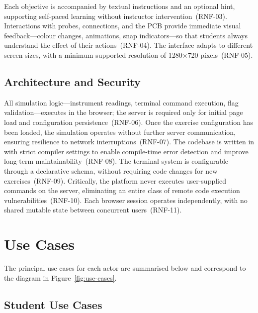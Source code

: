 Each objective is accompanied by textual instructions and an optional hint, supporting self-paced learning without instructor intervention~(RNF-03). Interactions with probes, connections, and the PCB provide immediate visual feedback---colour changes, animations, snap indicators---so that students always understand the effect of their actions~(RNF-04). The interface adapts to different screen sizes, with a minimum supported resolution of 1280$\times$720 pixels~(RNF-05).

\subsection{Architecture and Security}\label{subsec:rnf-architecture}

All simulation logic---instrument readings, terminal command execution, flag validation---executes in the browser; the server is required only for initial page load and configuration persistence~(RNF-06). Once the exercise configuration has been loaded, the simulation operates without further server communication, ensuring resilience to network interruptions~(RNF-07). The codebase is written in \typescript{} with strict compiler settings to enable compile-time error detection and improve long-term maintainability~(RNF-08). The terminal system is configurable through a declarative schema, without requiring code changes for new exercises~(RNF-09). Critically, the platform never executes user-supplied commands on the server, eliminating an entire class of remote code execution vulnerabilities~(RNF-10). Each browser session operates independently, with no shared mutable state between concurrent users~(RNF-11).

\section{Use Cases}\label{sec:usecases}

The principal use cases for each actor are summarised below and correspond to the diagram in Figure~\ref{fig:use-cases}.

\subsection{Student Use Cases}\label{subsec:uc-student}

